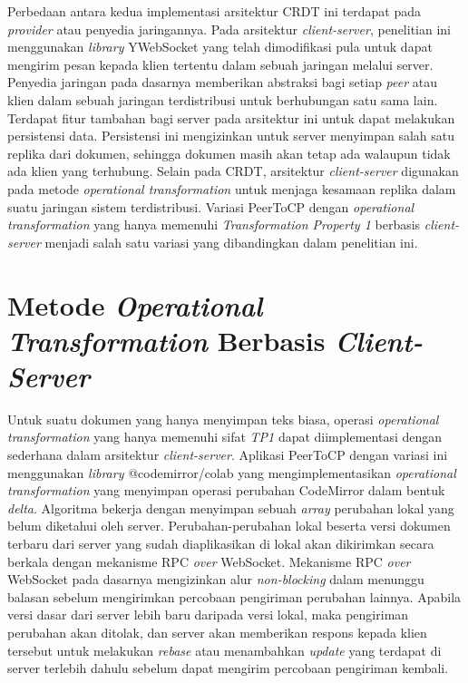 Perbedaan antara kedua implementasi arsitektur CRDT ini terdapat pada \textit{provider} atau penyedia jaringannya. Pada arsitektur \textit{client-server}, penelitian ini menggunakan \textit{library} YWebSocket yang telah dimodifikasi pula untuk dapat mengirim pesan kepada klien tertentu dalam sebuah jaringan melalui server. Penyedia jaringan pada dasarnya memberikan abstraksi bagi setiap \textit{peer} atau klien dalam sebuah jaringan terdistribusi untuk berhubungan satu sama lain. Terdapat fitur tambahan bagi server pada arsitektur ini untuk dapat melakukan persistensi data. Persistensi ini mengizinkan untuk server menyimpan salah satu replika dari dokumen, sehingga dokumen masih akan tetap ada walaupun tidak ada klien yang terhubung. Selain pada CRDT, arsitektur \textit{client-server} digunakan pada metode \textit{operational transformation} untuk menjaga kesamaan replika dalam suatu jaringan sistem terdistribusi. Variasi PeerToCP dengan \textit{operational transformation} yang hanya memenuhi \textit{Transformation Property 1} berbasis \textit{client-server} menjadi salah satu variasi yang dibandingkan dalam penelitian ini.

\section{Metode \textit{Operational Transformation} Berbasis \textit{Client-Server}}
\label{sec:design_ot}

Untuk suatu dokumen yang hanya menyimpan teks biasa, operasi \textit{operational transformation} yang hanya memenuhi sifat \textit{TP1} dapat diimplementasi dengan sederhana dalam arsitektur \textit{client-server}. Aplikasi PeerToCP dengan variasi ini menggunakan \textit{library} @codemirror/colab yang mengimplementasikan \textit{operational transformation} yang menyimpan operasi perubahan CodeMirror dalam bentuk \textit{delta}. Algoritma bekerja dengan menyimpan sebuah \textit{array} perubahan lokal yang belum diketahui oleh server. Perubahan-perubahan lokal beserta versi dokumen terbaru dari server yang sudah diaplikasikan di lokal akan dikirimkan secara berkala dengan mekanisme RPC \textit{over} WebSocket. Mekanisme RPC \textit{over} WebSocket pada dasarnya mengizinkan alur \textit{non-blocking} dalam menunggu balasan sebelum mengirimkan percobaan pengiriman perubahan lainnya. Apabila versi dasar dari server lebih baru daripada versi lokal, maka pengiriman perubahan akan ditolak, dan server akan memberikan respons kepada klien tersebut untuk melakukan \textit{rebase} atau menambahkan \textit{update} yang terdapat di server terlebih dahulu sebelum dapat mengirim percobaan pengiriman kembali.

